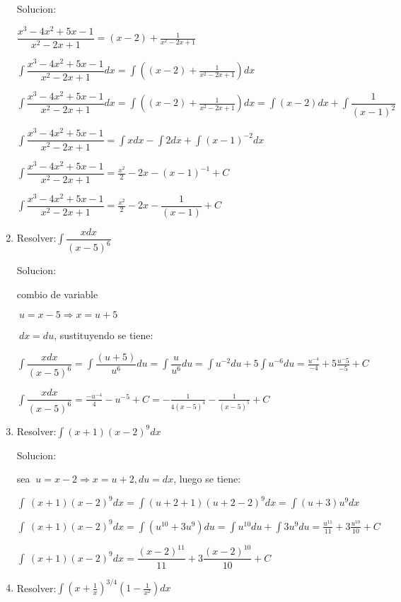 \documentclass[10pt,a4paper]{book}
\newcommand{\ds}{\displaystyle}
\begin{document}
\begin{enumerate}
        Solucion:

        $\ds\dfrac{x^3-4x^2+5x-1}{x^2-2x+1}=(x-2)+\frac{1}{x^2-2x+1}$
        
        $\ds\int\dfrac{x^3-4x^2+5x-1}{x^2-2x+1}dx=\int\left((x-2)+\frac{1}{x^2-2x+1}\right)dx$

        $\ds\int\dfrac{x^3-4x^2+5x-1}{x^2-2x+1}dx=\int\left((x-2)+\frac{1}{x^2-2x+1}\right)dx=\int(x-2)dx
        +\int \dfrac{1}{(x-1)^2}$ 

        $\ds\int\dfrac{x^3-4x^2+5x-1}{x^2-2x+1}=\int xdx-\int 2dx+\int(x-1)^{-2}dx$

        $\ds\int\dfrac{x^3-4x^2+5x-1}{x^2-2x+1}=\frac{x^2}{2}-2x-(x-1)^{-1}+C$ 

        $\ds\int\dfrac{x^3-4x^2+5x-1}{x^2-2x+1}=\frac{x^2}{2}-2x-\dfrac{1}{(x-1)}+C$
        
    \vspace{0.5cm}
    \item Resolver:$\ds\int\dfrac{xdx}{(x-5)^6}$
    
        Solucion:

        combio de variable

        $\ds\ u=x-5\Rightarrow x=u+5$

        $\ds\ dx=du$, sustituyendo se tiene:

        $\ds\int\dfrac{xdx}{(x-5)^6}=\ds\int\dfrac{(u+5)}{u^6}du=\int\dfrac{u}{u^6}du=\int u^{-2}du+5
        \int u^{-6}du=\frac{u^{-4}}{-4}+5\frac{u^-5}{-5}+C $

        $\ds\int\dfrac{xdx}{(x-5)^6}=\frac{-u^{-4}}{4}-u^{-5}+C=-\frac{1}{4(x-5)^4}-\frac{1}{(x-5)^5}+C$
        
    \vspace{0.5cm}
    \item Resolver:$\ds\int (x+1)(x-2)^9dx$
    
        Solucion:

        sea $\ds\ u=x-2 \Rightarrow x=u+2,du=dx$, luego se tiene:

        $\ds\int\ (x+1)(x-2)^9dx=\int(u+2+1)(u+2-2)^9dx=\int(u+3)u^9dx$

        $\ds\int\ (x+1)(x-2)^9dx=\int(u^10+3u^9)du=\int u^10du+\int3u^9du=\frac{u^11}{11}+3\frac{u^10}{10}+C$
        
        $\ds\int\ (x+1)(x-2)^9dx=\dfrac{(x-2)^11}{11}+3\dfrac{(x-2)^10}{10}+C$

    \vspace{0.5cm}
    \item Resolver:$\ds\int\left(x+\frac{1}{x} \right)^{3/4}\left(1-\frac{1}{x^2} \right)dx$
    

\end{enumerate}
\end{document}
